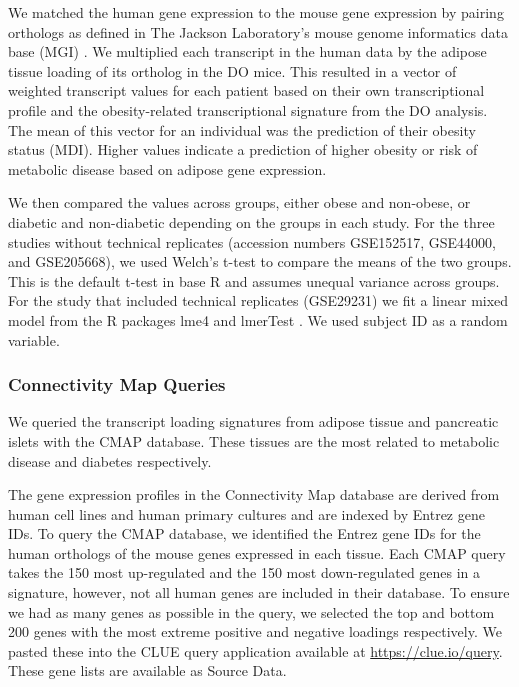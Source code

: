 \documentclass[
]{article}
\begin{document}
We matched the human gene expression to the mouse gene expression by
pairing orthologs as defined in The Jackson Laboratory's mouse genome
informatics data base (MGI) \cite{pmid38531069}. We multiplied each
transcript in the human data by the adipose tissue loading of its
ortholog in the DO mice. This resulted in a vector of weighted
transcript values for each patient based on their own transcriptional
profile and the obesity-related transcriptional signature from the DO
analysis. The mean of this vector for an individual was the prediction
of their obesity status (MDI). Higher values indicate a prediction of
higher obesity or risk of metabolic disease based on adipose gene
expression.

We then compared the values across groups, either obese and non-obese,
or diabetic and non-diabetic depending on the groups in each study. For
the three studies without technical replicates (accession numbers
GSE152517, GSE44000, and GSE205668), we used Welch's t-test to compare
the means of the two groups. This is the default t-test in base R and
assumes unequal variance across groups. For the study that included
technical replicates (GSE29231) we fit a linear mixed model from the R
packages lme4 \cite{lme4_package} and lmerTest \cite{lmerTest_package}.
We used subject ID as a random variable.

\subsubsection{Connectivity Map Queries}\label{connectivity-map-queries}

We queried the transcript loading signatures from adipose tissue and
pancreatic islets with the CMAP database. These tissues are the most
related to metabolic disease and diabetes respectively.

The gene expression profiles in the Connectivity Map database are
derived from human cell lines and human primary cultures and are indexed
by Entrez gene IDs. To query the CMAP database, we identified the Entrez
gene IDs for the human orthologs of the mouse genes expressed in each
tissue. Each CMAP query takes the 150 most up-regulated and the 150 most
down-regulated genes in a signature, however, not all human genes are
included in their database. To ensure we had as many genes as possible
in the query, we selected the top and bottom 200 genes with the most
extreme positive and negative loadings respectively. We pasted these
into the CLUE query application available at
\url{https://clue.io/query}. These gene lists are available as Source
Data.
\end{document}
